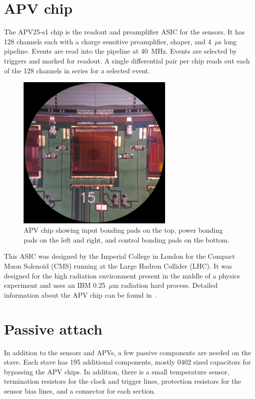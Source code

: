 \documentclass[preprint,12pt]{elsarticle}
\begin{document}
\section{APV chip}
The APV25-s1 chip is the readout and preamplifier ASIC for the sensors. It has
128 channels each with a charge sensitive preamplifier, shaper, and 4~$\mu$s long
pipeline. Events are read into the pipeline at 40~MHz. Events are selected by
triggers and marked for readout. A single differential pair per chip reads out each of
the 128 channels in series for a selected event.

\begin{figure}[ht]
\begin{center}
\includegraphics[width=3in, keepaspectratio=true, angle=0]{graphics/apv_chip.jpg}
\caption{APV chip showing input bonding pads on the top, power bonding pads on
the left and right, and control bonding pads on the bottom.
\label{fig:apv}}
\end{center}
\end{figure}

This ASIC was designed by the Imperial College in London for the Compact Muon
Solenoid (CMS) running at the Large Hadron Collider (LHC). It was designed
for the high radiation environment present in the middle of a physics experiment
and uses an IBM 0.25~$\mu$m radiation hard process. Detailed information about the
APV chip can be found in~\cite{ref:apv}.

\section{Passive attach}
In addition to the sensors and APVs, a few passive components are needed on the stave.
Each stave has 195 additional components, mostly 0402 sized capacitors for
bypassing the APV chips. In addition, there is a small temperature sensor,
termination resistors for the clock and trigger lines, protection resistors for
the sensor bias lines, and a connector for each section.
\end{document}
